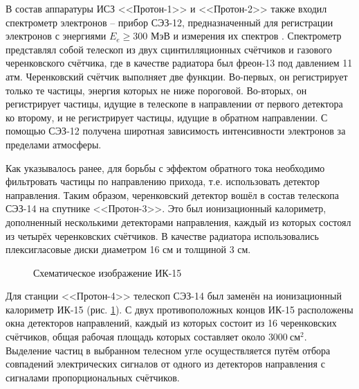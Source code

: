 \documentclass[12pt,a4paper]{report} %
\begin{document}
В состав аппаратуры ИСЗ <<Протон-1>> и <<Протон-2>> также входил спектрометр электронов – прибор СЭЗ-12, предназначенный для регистрации электронов с энергиями $E_e \geq 300$ МэВ и измерения их спектров \cite{SEZ12}. Спектрометр представлял собой телескоп из двух сцинтилляционных счётчиков и газового черенковского счётчика, где в качестве радиатора был фреон-13 под давлением 11 атм. Черенковский счётчик выполняет две функции. Во-первых, он регистрирует только те частицы, энергия которых не ниже пороговой. Во-вторых, он регистрирует частицы, идущие в телескопе в направлении от первого детектора ко второму, и не регистрирует частицы, идущие в обратном направлении. С помощью СЭЗ-12 получена широтная зависимость интенсивности электронов за пределами атмосферы. 

Как указывалось ранее, для борьбы с эффектом обратного тока необходимо фильтровать частицы по направлению прихода, т.е. использовать детектор направления. Таким образом, черенковский детектор вошёл в состав телескопа СЭЗ-14  на спутнике <<Протон-3>>. Это был ионизационный калориметр, дополненный несколькими детекторами направления, каждый из которых состоял из четырёх черенковских счётчиков. В качестве радиатора использовались плексигласовые диски диаметром 16 см и толщиной 3 см. 
\begin{figure}[th]
	\noindent{}
	\caption{Схематическое изображение ИК-15}
	\label{picIK15}
\end{figure}
Для станции <<Протон-4>> телескоп СЭЗ-14 был заменён на ионизационный калориметр ИК-15 (рис. \ref{picIK15}). С двух противоположных концов ИК-15 расположены окна детекторов направлений, каждый из которых состоит из 16 черенковских счётчиков, общая рабочая площадь которых составляет около $3000~см^2$. Выделение частиц в выбранном телесном угле осуществляется путём отбора совпадений электрических сигналов от одного из детекторов направления с сигналами пропорциональных счётчиков.
\end{document}
